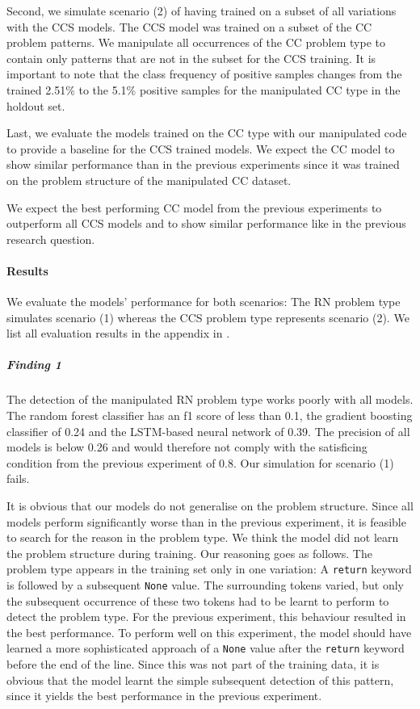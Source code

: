 Second, we simulate scenario (2) of having trained on a subset of all variations with the CCS models. The CCS model was trained on a subset of the CC problem patterns. We manipulate all occurrences of the CC problem type to contain only patterns that are not in the subset for the CCS training. It is important to note that the class frequency of positive samples changes from the trained 2.51\% to the 5.1\% positive samples for the manipulated CC type in the holdout set.

Last, we evaluate the models trained on the CC type with our manipulated code to provide a baseline for the CCS trained models. We expect the CC model to show similar performance than in the previous experiments since it was trained on the problem structure of the manipulated CC dataset.

We expect the best performing CC model from the previous experiments to outperform all CCS models and to show similar performance like in the previous research question. 

\paragraph{Results}
We evaluate the models' performance for both scenarios: The RN problem type simulates scenario (1) whereas the CCS problem type represents scenario (2). We list all evaluation results in the appendix in .

\subparagraph{Finding 1}\label{finding:return_none_manipulated_bad}
The detection of the manipulated RN problem type works poorly with all models. The random forest classifier has an f1 score of less than 0.1, the gradient boosting classifier of 0.24 and the LSTM-based neural network of 0.39. The precision of all models is below 0.26 and would therefore not comply with the satisficing condition from the previous experiment of 0.8. Our simulation for scenario (1) fails.

It is obvious that our models do not generalise on the problem structure.  Since all models perform significantly worse than in the previous experiment, it is feasible to search for the reason in the problem type.  We think the model did not learn the problem structure during training. Our reasoning goes as follows.
The problem type appears in the training set only in one variation: A \texttt{return} keyword is followed by a subsequent \texttt{None} value. The surrounding tokens varied, but only the subsequent occurrence of these two tokens had to be learnt to perform to detect the problem type. For the previous experiment, this behaviour resulted in the best performance. To perform well on this experiment, the model should have learned a more sophisticated approach of a \texttt{None} value after the \texttt{return} keyword before the end of the line. Since this was not part of the training data, it is obvious that the model learnt the simple subsequent detection of this pattern, since it yields the best performance in the previous experiment.

